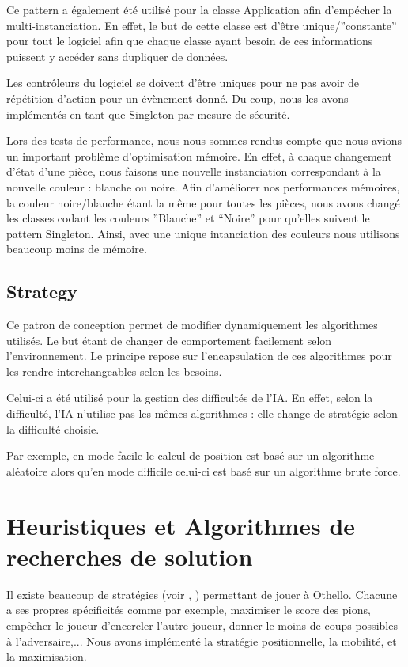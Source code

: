 \documentclass[a4paper,12pt]{report}
\begin{document}
Ce pattern a également été utilisé pour la classe Application afin d’empécher la multi-instanciation. En effet, le but de cette classe est d’être unique/”constante” pour tout le logiciel afin que chaque classe ayant besoin de ces informations puissent y accéder sans dupliquer de données.

Les contrôleurs du logiciel se doivent d’être uniques pour ne pas avoir de répétition d’action pour un évènement donné. Du coup, nous les avons implémentés en tant que Singleton par mesure de sécurité.

Lors des tests de performance, nous nous sommes rendus compte que nous avions un important problème d’optimisation mémoire. En effet, à chaque changement d’état d’une pièce, nous faisons une nouvelle instanciation correspondant à la nouvelle couleur : blanche ou noire. Afin d’améliorer nos performances mémoires, la couleur noire/blanche étant la même pour toutes les pièces, nous avons changé les classes codant les couleurs ”Blanche” et “Noire” pour qu’elles suivent le pattern Singleton. Ainsi, avec une unique intanciation des couleurs nous utilisons beaucoup moins de mémoire.

\subsection{Strategy}

Ce patron de conception permet de modifier dynamiquement les algorithmes utilisés. Le but étant de changer de comportement facilement selon l’environnement. Le principe repose sur l’encapsulation de ces algorithmes pour les rendre interchangeables selon les besoins.

Celui-ci a été utilisé pour la gestion des difficultés de l’IA. En effet, selon la difficulté, l’IA n’utilise pas les mêmes algorithmes : elle change de stratégie selon la difficulté choisie.

Par exemple, en mode facile le calcul de position est basé sur un algorithme aléatoire alors qu’en mode difficile celui-ci est basé sur un algorithme brute force.

\section{Heuristiques et Algorithmes de recherches de solution}

Il existe beaucoup de stratégies (voir \cite{strategy}, \cite{13}) permettant de jouer à Othello. Chacune a ses propres spécificités comme par exemple, maximiser le score des pions, empêcher le joueur d'encercler l'autre joueur, donner le moins de coups possibles à l'adversaire,... Nous avons implémenté la stratégie positionnelle, la mobilité, et la maximisation.
\end{document}
